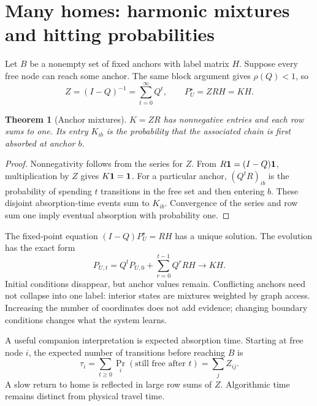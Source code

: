 \documentclass[12pt]{article}
\newtheorem{theorem}{Theorem}\newtheorem{proposition}[theorem]{Proposition}\newtheorem{lemma}[theorem]{Lemma}
\newcommand{\page}[1]{\section{#1}}
\begin{document}
\page{Many homes: harmonic mixtures and hitting probabilities}
Let $B$ be a nonempty set of fixed anchors with label matrix $H$. Suppose every free node can reach some anchor. The same block argument gives $\rho(Q)<1$, so
\begin{equation}Z=(I-Q)^{-1}=\sum_{t=0}^{\infty}Q^t,\qquad P_U^\star=ZR H=KH.\end{equation}
\begin{theorem}[Anchor mixtures]
$K=ZR$ has nonnegative entries and each row sums to one. Its entry $K_{ib}$ is the probability that the associated chain is first absorbed at anchor $b$.
\end{theorem}
\begin{proof}
Nonnegativity follows from the series for $Z$. From $R\mathbf1=(I-Q)\mathbf1$, multiplication by $Z$ gives $K\mathbf1=\mathbf1$. For a particular anchor, $(Q^tR)_{ib}$ is the probability of spending $t$ transitions in the free set and then entering $b$. These disjoint absorption-time events sum to $K_{ib}$. Convergence of the series and row sum one imply eventual absorption with probability one.
\end{proof}
The fixed-point equation $(I-Q)P_U^\star=RH$ has a unique solution. The evolution has the exact form
\begin{equation}P_{U,t}=Q^tP_{U,0}+\sum_{r=0}^{t-1}Q^rRH\longrightarrow KH.\end{equation}
Initial conditions disappear, but anchor values remain. Conflicting anchors need not collapse into one label: interior states are mixtures weighted by graph access. Increasing the number of coordinates does not add evidence; changing boundary conditions changes what the system learns.

A useful companion interpretation is expected absorption time. Starting at free node $i$, the expected number of transitions before reaching $B$ is
\begin{equation}\tau_i=\sum_{t\geq0}\Pr_i(\text{still free after }t)=\sum_jZ_{ij}.\end{equation}
A slow return to home is reflected in large row sums of $Z$. Algorithmic time remains distinct from physical travel time.
\end{document}
